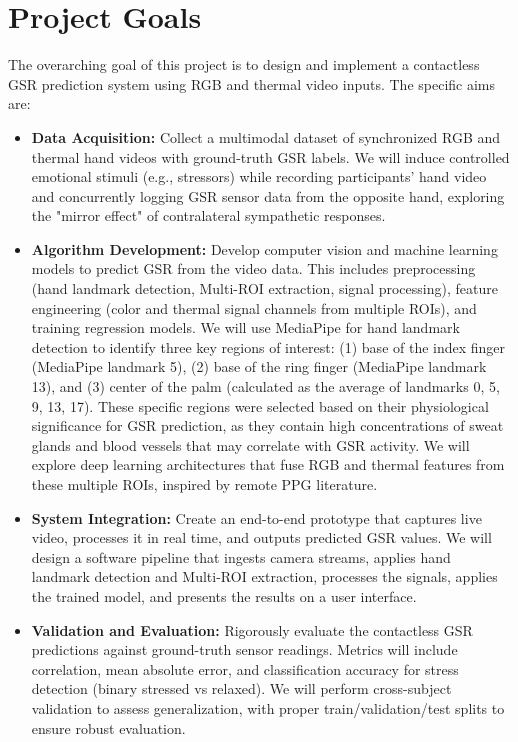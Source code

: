     \section{Project Goals}
    The overarching goal of this project is to design and implement a contactless GSR prediction system using RGB and thermal video inputs. The specific aims are:
    \begin{itemize}
        \item \textbf{Data Acquisition:} Collect a multimodal dataset of synchronized RGB and thermal hand videos with ground-truth GSR labels. We will induce controlled emotional stimuli (e.g., stressors) while recording participants' hand video and concurrently logging GSR sensor data from the opposite hand, exploring the "mirror effect" of contralateral sympathetic responses.
        \item \textbf{Algorithm Development:} Develop computer vision and machine learning models to predict GSR from the video data. This includes preprocessing (hand landmark detection, Multi-ROI extraction, signal processing), feature engineering (color and thermal signal channels from multiple ROIs), and training regression models. We will use MediaPipe for hand landmark detection to identify three key regions of interest: (1) base of the index finger (MediaPipe landmark 5), (2) base of the ring finger (MediaPipe landmark 13), and (3) center of the palm (calculated as the average of landmarks 0, 5, 9, 13, 17). These specific regions were selected based on their physiological significance for GSR prediction, as they contain high concentrations of sweat glands and blood vessels that may correlate with GSR activity. We will explore deep learning architectures that fuse RGB and thermal features from these multiple ROIs, inspired by remote PPG literature.
        \item \textbf{System Integration:} Create an end-to-end prototype that captures live video, processes it in real time, and outputs predicted GSR values. We will design a software pipeline that ingests camera streams, applies hand landmark detection and Multi-ROI extraction, processes the signals, applies the trained model, and presents the results on a user interface.
        \item \textbf{Validation and Evaluation:} Rigorously evaluate the contactless GSR predictions against ground-truth sensor readings. Metrics will include correlation, mean absolute error, and classification accuracy for stress detection (binary stressed vs relaxed). We will perform cross-subject validation to assess generalization, with proper train/validation/test splits to ensure robust evaluation.

\end{itemize}
